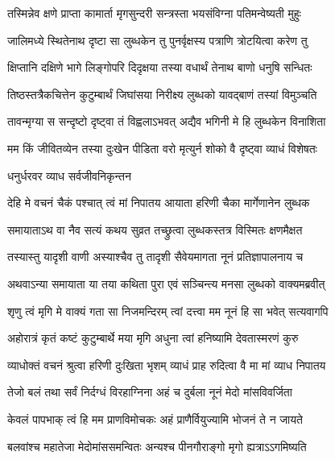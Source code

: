 \twolineshloka
{तस्मिन्नेव क्षणे प्राप्ता कामार्ता मृगसुन्दरी}
{सन्त्रस्ता भयसंविग्ना पतिमन्वेष्यती मुहुः}%

\twolineshloka
{जालिमध्ये स्थितेनाथ दृष्टा सा लुब्धकेन तु}
{पुनर्वृक्षस्य पत्राणि त्रोटयित्वा करेण तु}%

\twolineshloka
{क्षिप्तानि दक्षिणे भागे लिङ्गोपरि दिदृक्षया}
{तस्या वधार्थं तेनाथ बाणो धनुषि सन्धितः}%

\twolineshloka
{तिष्ठस्तत्रैकचित्तेन कुटुम्बार्थं जिघांसया}
{निरीक्ष्य लुब्धको यावद्बाणं तस्यां विमुञ्चति}%

\twolineshloka
{तावन्मृग्या स सन्दृष्टो दृष्ट्वा तं विह्वलाऽभवत्}
{अद्यैव भगिनी मे हि लुब्धकेन विनाशिता}%

\twolineshloka
{मम किं जीवितव्येन तस्या दुःखेन पीडिता}
{वरो मृत्युर्न शोको वै दृष्ट्वा व्याधं विशेषतः}%



\onelineshloka
{धनुर्धरवर व्याध सर्वजीवनिकृन्तन}%

\twolineshloka
{देहि मे वचनं चैकं पश्चात् त्वं मां निपातय}
{आयाता हरिणी चैका मार्गेणानेन लुब्धक}%

\twolineshloka
{समायाताऽथ वा नैव सत्यं कथय सुव्रत}
{तच्छ्रुत्वा लुब्धकस्तत्र विस्मितः क्षणमैक्षत}%

\twolineshloka
{तस्यास्तु यादृशी वाणी अस्याश्चैव तु तादृशी}
{सैवेयमागता नूनं प्रतिज्ञापालनाय च}%

\twolineshloka
{अथवाऽन्या समायाता या तया कथिता पुरा}
{एवं सञ्चिन्त्य मनसा लुब्धको वाक्यमब्रवीत्}%


\twolineshloka
{शृणु त्वं मृगि मे वाक्यं गता सा निजमन्दिरम्}
{त्वां दत्त्वा मम नूनं हि सा भवेत् सत्यवागपि}%

\twolineshloka
{अहोरात्रं कृतं कष्टं कुटुम्बार्थे मया मृगि}
{अधुना त्वां हनिष्यामि देवतास्मरणं कुरु}%

\twolineshloka
{व्याधोक्तं वचनं श्रुत्वा हरिणी दुःखिता भृशम्}
{व्याधं प्राह रुदित्वा वै मा मां व्याध निपातय}%

\twolineshloka
{तेजो बलं तथा सर्वं निर्दग्धं विरहाग्निना}
{अहं च दुर्बला नूनं मेदो मांसविवर्जिता}%

\twolineshloka
{केवलं पापभाक् त्वं हि मम प्राणविमोचकः}
{अहं प्राणैर्वियुज्यामि भोजनं ते न जायते}%

\twolineshloka
{बलवांश्च महातेजा मेदोमांससमन्वितः}
{अन्यश्च पीनगौराङ्गो मृगो ह्यत्राऽऽगमिष्यति}%

